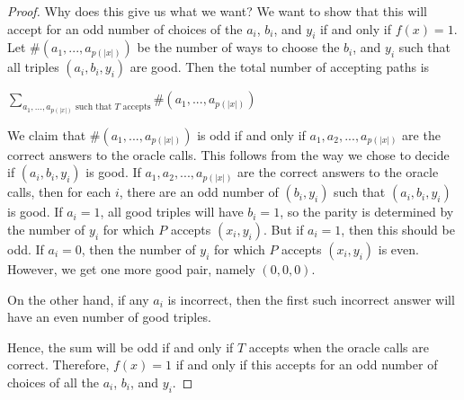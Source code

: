 \documentclass[11pt]{article}
\newcommand{\bp}{\textsf{BP}}
\newcommand{\parity}{\oplus}
\newcommand{\p}{\textsf{P}}
\newcommand{\pp}{\textsf{PP}}
\begin{document}
\begin{proof}
Why does this give us what we want? We want to show that this will accept for an odd number of choices of the $a_i$, $b_i$, and $y_i$ if and only if $f(x) = 1$. Let $\# (a_1,...,a_{p(|x|)})$ be the number of ways to choose the $b_i$, and $y_i$ such that all triples $(a_i,b_i,y_i)$ are good. Then the total number of accepting paths is
\begin{center}$\displaystyle \sum_{a_1,...,a_{p(|x|)}\text{ such that $T$ accepts}}  \#(a_1,...,a_{p(|x|)})$\end{center}
We claim that $ \#(a_1,...,a_{p(|x|)})$ is odd if and only if $a_1,a_2,...,a_{p(|x|)}$ are the correct answers to the oracle calls. This follows from the way we chose to decide if $(a_i, b_i, y_i)$ is good. If $a_1,a_2,...,a_{p(|x|)}$ are the correct answers to the oracle calls, then for each $i$, there are an odd number of $(b_i,y_i)$ such that $(a_i, b_i, y_i)$ is good. If $a_i = 1$, all good triples will have $b_i = 1$, so the parity is determined by the number of $y_i$ for which $P$ accepts $(x_i, y_i)$. But if $a_i = 1$, then this should be odd. If $a_i = 0$, then the number of $y_i$ for which $P$ accepts $(x_i, y_i)$ is even. However, we get one more good pair, namely $(0,0,0)$.

On the other hand, if any $a_i$ is incorrect, then the first such incorrect answer will have an even number of good triples.

Hence, the sum will be odd if and only if $T$ accepts when the oracle calls are correct. Therefore, $f(x) = 1$ if and only if this accepts for an odd number of choices of all the $a_i$, $b_i$, and $y_i$.

\end{proof}
\end{document}
